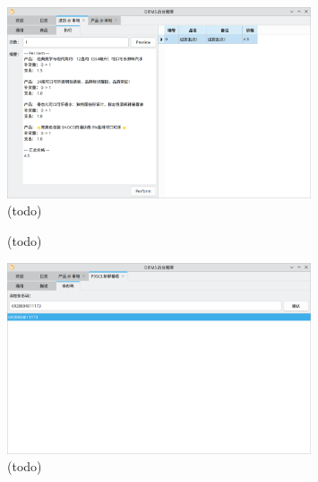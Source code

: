 \begin{figure}[htbp]
	\centering
	\includegraphics[width=0.8\textwidth]{./exp/rma-ir-exec-1.png}
	\caption{(todo)}
	\label{fig:rma-ir-exec-1}
\end{figure}

\begin{figure}[htbp]
    \hfill
	\caption{(todo)}
	\label{fig:rma-audit}
\end{figure}

\begin{figure}[htbp]
	\centering
	\includegraphics[width=0.8\textwidth]{./exp/rma-bc.png}
	\caption{(todo)}
	\label{fig:rma-bc}
\end{figure}

